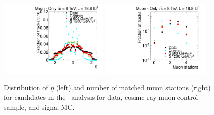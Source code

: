 \begin{figure}
\centering
  \includegraphics[clip=false, trim=0.0cm 0cm 0.0cm 0cm, width=0.48\textwidth]{figures/muonly/Selection_Comp_8TeV_Cosmic_Eta_BS}
  \includegraphics[clip=false, trim=0.0cm 0cm 0.0cm 0cm, width=0.48\textwidth]{figures/muonly/Selection_Comp_8TeV_Cosmic_MatchedStations_BS} \\
\caption[Distribution of $\eta$ and number of matched muon stations for data, cosmic-ray muon control sample, and signal MC in the \muononly\ analysis.]
{Distribution of $\eta$ (left) and number of matched muon stations (right) for candidates in the \muononly\ analysis
for data, cosmic-ray muon control sample, and signal MC.}
    \label{fig:MuOnlyPreselA}
\end{figure}


